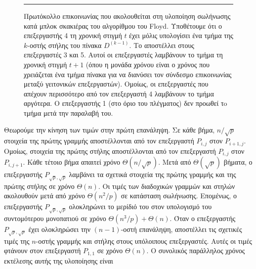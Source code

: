 \documentclass[12pt,a4paper]{article}
\begin{document}
\begin{figure}[H]
\centering
{}
\vspace{0.3cm}
\noindent\rule{\textwidth}{0.2pt}
\caption{Πρωτόκολλο επικοινωνίας που ακολουθείται στη υλοποίηση σωλήνωσης κατά μπλοκ σκακιέρας του αλγορίθμου του \foreignlanguage{english}{Floyd}. Υποθέτουμε ότι ο επεξεργαστής 4 τη χρονική στιγμή $t$ έχει μόλις υπολογίσει ένα τμήμα της $k$-οστής στήλης του πίνακα $D^{(k-1)}$. Το αποστέλλει στους επεξεργαστές 3 και 5. Αυτοί οι επεξεργαστές λαμβάνουν το τμήμα τη χρονική στιγμή $t+1$ (όπου η μονάδα χρόνου είναι ο χρόνος που χρειάζεται ένα τμήμα πίνακα για να διανύσει τον σύνδεσμο επικοινωνίας μεταξύ γειτονικών επεξεργαστών). Ομοίως, οι επεξεργαστές που απέχουν περισσότερο από τον επεξεργαστή 4 λαμβάνουν το τμήμα αργότερα. Ο επεξεργαστής 1 (στο όριο του πλέγματος) δεν προωθεί τo τμήμα μετά την παραλαβή του.}
\label{fig:graph11}
\end{figure}

Θεωρούμε την κίνηση των τιμών στην πρώτη επανάληψη. Σε κάθε βήμα, $n/\sqrt{p}$ στοιχεία της πρώτης γραμμής αποστέλλονται από τον επεξεργαστή $P_{i,j}$ στον $P_{i+1,j}$. Ομοίως, στοιχεία της πρώτης στήλης αποστέλλονται από τον επεξεργαστή $P_{i,j}$ στον $P_{i,j+1}$. Κάθε τέτοιο βήμα απαιτεί χρόνο $\Theta(n/\sqrt{p})$. Μετά από $\Theta(\sqrt{p})$ βήματα, ο επεξεργαστής $P_{\sqrt{p},\sqrt{p}}$ λαμβάνει τα σχετικά στοιχεία της πρώτης γραμμής και της πρώτης στήλης σε χρόνο $\Theta(n)$. Οι τιμές των διαδοχικών γραμμών και στηλών ακολουθούν μετά από χρόνο $\Theta(n^2/p)$ σε κατάσταση σωλήνωσης. Επομένως, ο επεξεργαστής $P_{\sqrt{p},\sqrt{p}}$ ολοκληρώνει το μερίδιό του στον υπολογισμό του συντομότερου μονοπατιού σε χρόνο $\Theta(n^3/p) + \Theta(n)$. Όταν ο επεξεργαστής $P_{\sqrt{p},\sqrt{p}}$ έχει ολοκληρώσει την $(n-1)$-οστή επανάληψη, αποστέλλει τις σχετικές τιμές της $n$-οστής γραμμής και στήλης στους υπόλοιπους επεξεργαστές. Αυτές οι τιμές φτάνουν στον επεξεργαστή $P_{1,1}$ σε χρόνο $\Theta(n)$. Ο συνολικός παράλληλος χρόνος εκτέλεσης αυτής της υλοποίησης είναι
\end{document}
